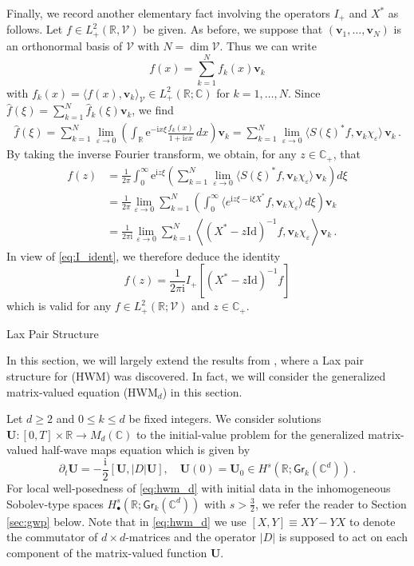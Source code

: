 \documentclass[11pt,reqno]{amsart}
\makeatletter
\theoremstyle{definition}
\theoremstyle{remark}
\theoremstyle{remark}
\numberwithin{equation}{section}
\newcommand{\C}{\mathbb{C}}
\newcommand{\R}{\mathbb{R}}
\newcommand{\VV}{\mathcal{V}}
\newcommand{\pt}{\partial}
\newcommand{\be}{\begin{equation}}
\newcommand{\ee}{\end{equation}}
\newcommand{\eps}{\varepsilon}
\newcommand{\ii}{\mathrm{i}}
\newcommand{\eu}{\mathrm{e}}
\newcommand{\vv}{\mathbf{v}}
\newcommand{\Ub}{\mathbf{U}}
\newcommand{\id}{\mathrm{Id}}
\newcommand{\Gr}{\mathsf{Gr}}
\def\section{\@startsection{section}{1}%
  \z@{1.5\linespacing\@plus\linespacing}{.5\linespacing}%
  {\normalfont\bfseries\large\centering}}
\makeatother
\begin{document}
Finally, we record another elementary fact involving the operators $I_+$ and $X^*$ as follows. Let $f \in L^2_+(\R, \VV)$ be given. As before, we suppose that $(\vv_1, \ldots, \vv_N)$ is an orthonormal basis of $\VV$ with $N = \dim \VV$. Thus we can write 
$$
f(x) = \sum_{k=1}^N f_k(x) \vv_k
$$ 
with $f_k(x) = \langle f(x), \vv_k \rangle_{\VV} \in L^2_+(\R; \C)$ for $k=1, \ldots, N$. Since $\widehat{f}(\xi)= \sum_{k=1}^N \widehat{f}_k(\xi) \vv_k$, we find
\begin{align*}
\widehat{f}(\xi)  = \sum_{k=1}^N \lim_{\eps \to 0} \left ( \int_\R \eu^{-\ii  x \xi} \frac{ f_k(x) }{1+\ii \eps x} \, dx \right ) \vv_k =  \sum_{k=1}^N \lim_{\eps \to 0} \langle S(\xi)^* f,  \vv_k\chi_\eps \rangle \, \vv_k \, .
\end{align*}
By taking the inverse Fourier transform, we obtain, for any $z \in \C_+$, that
\begin{align*}
f(z) & = \frac{1}{2 \pi} \int_0^{\infty} \eu^{\ii z \xi}   \left ( \sum_{k=1}^N \lim_{\eps \to 0} \langle S(\xi)^* f,  \vv_k\chi_\eps \rangle \, \vv_k \right ) d \xi \\
& = \frac{1}{2 \pi}  \lim_{\eps \to 0} \sum_{k=1}^N \left ( \int_0^{\infty}    \langle e^{\ii z \xi -\ii \xi X^*}  f,  \vv_k\chi_\eps \rangle \, d \xi \right ) \vv_k  \\
& = \frac{1}{2 \pi \ii} \lim_{\eps \to 0}  \sum_{k=1}^N \left \langle (X^*- z \id)^{-1} f, \vv_k \chi_\eps \right \rangle \vv_k \, .
\end{align*}
In view of \eqref{eq:I_ident}, we therefore deduce the identity
\be \label{eq:reproduce}
\boxed{f(z) = \frac{1}{2 \pi \ii} I_+[(X^*- z \id)^{-1} f] }
\ee
which is valid for any $f \in L^2_+(\R; \VV)$ and $z \in \C_+$. 
 


\section{Lax Pair Structure}

\label{sec:lax}

In this section, we will largely extend the results from \cite{GeLe-18}, where a Lax pair structure for (HWM) was discovered. In fact, we will consider the generalized matrix-valued equation (HWM$_d$) in this section.

 Let $d \geq 2$ and $0 \leq k \leq d$ be fixed integers. We consider solutions $\Ub : [0,T] \times \R \to M_d(\C)$ to the initial-value problem for the generalized matrix-valued half-wave maps equation which is given by 
\be \tag{HWM$_d$} \label{eq:hwm_d}
\pt_t \Ub = -\frac{\ii}{2} [ \Ub, |D| \Ub ], \quad \Ub(0) = \Ub_0 \in H^s(\R; \Gr_k(\C^d)) \, .
\ee
For local well-posedness of \eqref{eq:hwm_d} with initial data in the inhomogeneous Sobolev-type spaces $H^s_\bullet(\R; \Gr_k(\C^d))$ with $s > \frac{3}{2}$, we refer the reader to Section \ref{sec:gwp} below. Note that in \eqref{eq:hwm_d} we use $[X,Y] \equiv XY-YX$ to denote the commutator of $d \times d$-matrices and the operator $|D|$ is supposed to act on each component of the matrix-valued function $\Ub$.
\end{document}
